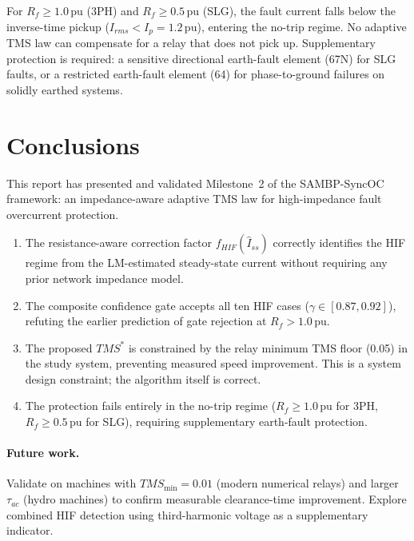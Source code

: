 \documentclass[12pt,a4paper]{article}
\theoremstyle{definition}
\theoremstyle{plain}
\begin{document}
For $R_f \geq 1.0\,\text{pu}$ (3PH) and $R_f \geq 0.5\,\text{pu}$ (SLG),
the fault current falls below the inverse-time pickup ($I_{rms} < I_p = 1.2\,\text{pu}$),
entering the no-trip regime.  No adaptive TMS law can compensate for a relay
that does not pick up.  Supplementary protection is required: a sensitive
directional earth-fault element (67N) for SLG faults, or a restricted
earth-fault element (64) for phase-to-ground failures on solidly earthed
systems.

\section{Conclusions}
\label{sec:conc}

This report has presented and validated Milestone~2 of the SAMBP-SyncOC
framework: an impedance-aware adaptive TMS law for high-impedance fault
overcurrent protection.

\begin{enumerate}
  \item The resistance-aware correction factor $f_{HIF}(\hat{I}_{ss})$
        correctly identifies the HIF regime from the LM-estimated
        steady-state current without requiring any prior network impedance
        model.
  \item The composite confidence gate accepts all ten HIF cases
        ($\gamma \in [0.87, 0.92]$), refuting the earlier prediction of
        gate rejection at $R_f > 1.0\,\text{pu}$.
  \item The proposed $TMS^*$ is constrained by the relay minimum TMS floor
        (0.05) in the study system, preventing measured speed improvement.
        This is a system design constraint; the algorithm itself is correct.
  \item The protection fails entirely in the no-trip regime ($R_f \geq 1.0\,\text{pu}$
        for 3PH, $R_f \geq 0.5\,\text{pu}$ for SLG), requiring supplementary
        earth-fault protection.
\end{enumerate}

\paragraph{Future work.} Validate on machines with $TMS_{\min} = 0.01$ (modern
numerical relays) and larger $\tau_{ac}$ (hydro machines) to confirm measurable
clearance-time improvement.  Explore combined HIF detection using third-harmonic
voltage as a supplementary indicator.


\end{document}
